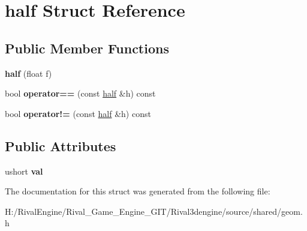 \hypertarget{structhalf}{}\section{half Struct Reference}
\label{structhalf}
\subsection*{Public Member Functions}
\begin{DoxyCompactItemize}
\item 
\mbox{\label{structhalf_a99acfa5329e169f52964715cecda3233}} 
{\bfseries half} (float f)
\item 
\mbox{\label{structhalf_abe001f5a30c1ac90109858cb3e743f5f}} 
bool {\bfseries operator==} (const \hyperlink{structhalf}{half} \&h) const
\item 
\mbox{\label{structhalf_ad9c135c856dd827c8b3df0c81a0f3ec3}} 
bool {\bfseries operator!=} (const \hyperlink{structhalf}{half} \&h) const
\end{DoxyCompactItemize}
\subsection*{Public Attributes}
\begin{DoxyCompactItemize}
\item 
\mbox{\label{structhalf_ae0c58bfb0408fe23acd894d1b936f3d9}} 
ushort {\bfseries val}
\end{DoxyCompactItemize}


The documentation for this struct was generated from the following file\+:\begin{DoxyCompactItemize}
\item 
H\+:/\+Rival\+Engine/\+Rival\+\_\+\+Game\+\_\+\+Engine\+\_\+\+G\+I\+T/\+Rival3dengine/source/shared/geom.\+h\end{DoxyCompactItemize}
